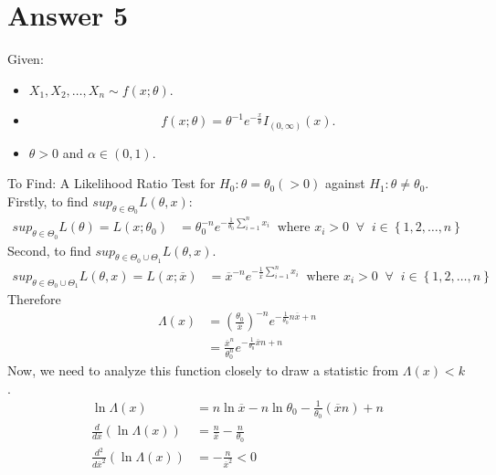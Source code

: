 \documentclass[a4paper]{article}
\begin{document}
\section{Answer 5}
Given:
\begin{itemize}
	\item {$X_1,X_2,\dots,X_n \sim f\left( x;\theta \right) $.}
	\item{ \[
				f\left( x;\theta \right) = \theta^{-1}e^{-\frac{x}{\theta}}I_{\left( 0,\infty \right) } \left( x \right) 
	.\] }
\item{$\theta >  0$ and  $\alpha \in \left( 0,1 \right) $.}
\end{itemize}
To Find: A Likelihood Ratio Test for $H_0 : \theta = \theta_0\left( >0 \right) $ against $H_1 : \theta  \neq \theta_0$.
\newline\newline
Firstly, to find $sup_{\theta\in \Theta_0} L\left( \theta,x \right)$:
\begin{equation*}
	\begin{split}
		sup_{\theta \in \Theta_0} L\left( \theta \right) = L\left( x;\theta_0 \right) &=  \theta_0^{-n} e^{-\frac{1}{\theta_0} \sum_{i=1}^{n} x_i} \;\;\text{where  $x_i > 0 \;\;\forall\;\; i \in \left\{ 1,2,\dots,n \right\} $} 
	\end{split}
\end{equation*}
Second, to find $sup_{\theta \in \Theta_0 \cup \Theta_1} L\left( \theta, x\right) $.
\begin{equation*}
	\begin{split}
		sup_{\theta \in \Theta_0 \cup \Theta_1} L\left( \theta, x\right) = L\left( x;\overline{x} \right) &=  \overline{x}^{-n} e^{-\frac{1}{\overline{x}} \sum_{i=1}^{n} x_i} \;\;\text{where  $x_i > 0 \;\;\forall\;\; i \in \left\{ 1,2,\dots,n \right\} $} 
	\end{split}
\end{equation*}
Therefore
\begin{equation*}
	\begin{split}
			\Lambda\left( x \right) &=  \left( \frac{\theta_0}{\overline{x}} \right)^{-n} e^{-\frac{1}{\theta_0}n\overline{x} + n}\\
			&= \frac{\overline{x}^{n}}{\theta_0^{n}} e^{-\frac{1}{\theta_0} \overline{x}n + n}
	\end{split}
\end{equation*}
Now, we need to analyze this function closely to draw a statistic from $\Lambda\left( x \right) < k$.
\begin{equation*}
	\begin{split}
		\ln \Lambda\left( x \right) &=  n \ln \overline{x} - n \ln \theta_0 - \frac{1}{\theta_0} \left( \overline{x} n  \right) + n\\
\frac{d}{d\overline{x}} \left( \ln\Lambda\left( x \right)  \right) &=  \frac{n}{\overline{x}} -\frac{n}{\theta_0}\\
\frac{d^2}{d\overline{x}^2} \left( \ln\Lambda\left( x \right)  \right) &=  -\frac{n}{\overline{x}^2} < 0
	\end{split}
\end{equation*}
\end{document}
